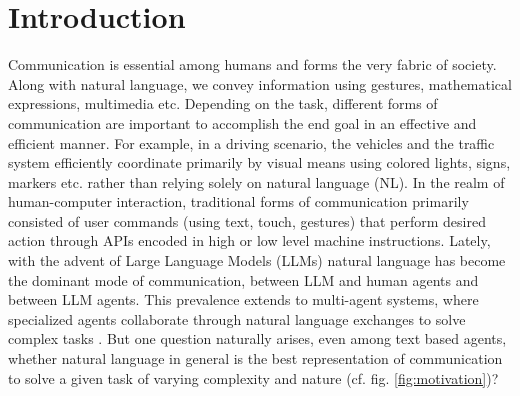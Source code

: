 \section{Introduction}\label{intro}

Communication is essential among humans and forms the very fabric of society. Along with natural language, we convey information using gestures, mathematical expressions, multimedia etc. 
Depending on the task, different forms of communication are important to accomplish the end goal in an effective and efficient manner. For example, in a driving scenario, the vehicles and the traffic system efficiently coordinate primarily by visual means using colored lights, signs, markers etc. rather than relying solely on natural language (NL).  In the realm of human-computer interaction, traditional forms of communication primarily consisted of user commands (using text, touch, gestures) that perform desired action through APIs encoded in high or low level machine instructions. Lately, with the advent of Large Language Models (LLMs) natural language has become the dominant mode of communication, between LLM and human agents and between LLM agents. This prevalence extends to multi-agent systems, where specialized agents collaborate through natural language exchanges to solve complex tasks \cite{li2023camel,wu2023autogen,park2023generative}. But one question naturally arises, even among text based agents, whether natural language in general is the best representation of communication to solve a given task of varying complexity and nature (cf. fig. \ref{fig:motivation})? 

